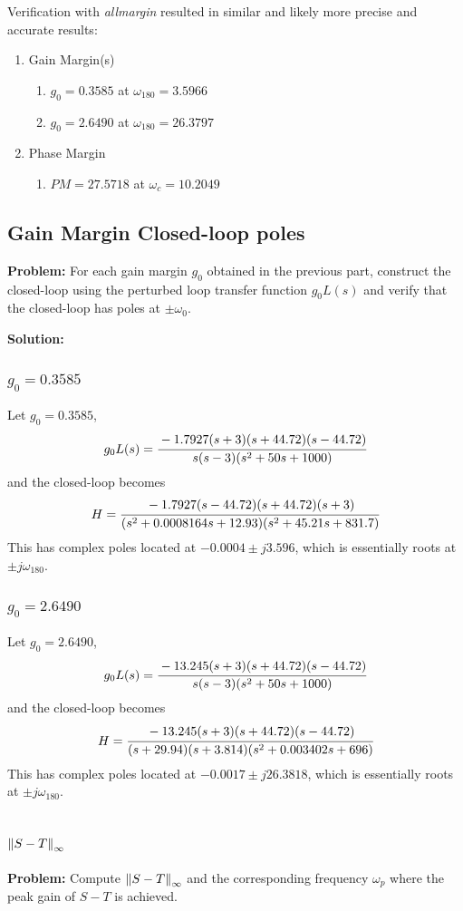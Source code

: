 \documentclass[letter]{article}
\numberwithin{equation}{section}
\begin{document}
Verification with \emph{allmargin} resulted in similar and likely more precise and accurate results:
\begin{enumerate}
	\item Gain Margin(s)
	\begin{enumerate}
		\item $g_0 = 0.3585$ at $\omega_{180} =  3.5966$
		\item $g_0 = 2.6490$ at $\omega_{180} = 26.3797$
	\end{enumerate}
	\item Phase Margin
	\begin{enumerate}
		\item $PM = 27.5718$ at $\omega_{c} = 10.2049$
	\end{enumerate}
\end{enumerate}

\subsection{Gain Margin Closed-loop poles}
\textbf{Problem:} 
For each gain margin $g_0$ obtained in the previous part, construct the closed-loop using the perturbed loop transfer function $g_0 L(s)$ and verify that the closed-loop has poles at $\pm \omega_0$.

\textbf{Solution:}
\subsubsection{$g_0 = 0.3585$}
Let $g_0 = 0.3585$, \[
	g_0 L(s) =  \cfrac{
		-1.7927 (s+3) (s+44.72) (s-44.72)
	}{
	   s (s-3) (s^2 + 50s + 1000)
	}
\] and the closed-loop becomes \[
	H = \cfrac{ 
          -1.7927 (s-44.72) (s+44.72) (s+3)
	}{
		(s^2 + 0.0008164s + 12.93) (s^2 + 45.21s + 831.7)
	}
\] This has complex poles located at $-0.0004 \pm j 3.596$, which is essentially roots at $\pm j \omega_{180}$.


\subsubsection{$g_0 = 2.6490$}
Let $g_0 = 2.6490$, \[
	g_0 L(s) =  \cfrac{
		-13.245 (s+3) (s+44.72) (s-44.72)
	}{
	   s (s-3) (s^2 + 50s + 1000)
	}
\] and the closed-loop becomes \[
	H = \cfrac{ 
		-13.245 (s+3) (s+44.72) (s-44.72)
	}{
		(s+29.94) (s+3.814) (s^2 + 0.003402s + 696)
	}
\] This has complex poles located at $-0.0017 \pm j 26.3818$, which is essentially roots at $\pm j \omega_{180}$.

\subsection{$\norm{S-T}_\infty$}
\textbf{Problem:}
Compute $\norm{S-T}_\infty$ and the corresponding frequency $\omega_{p}$ where the peak gain of $S-T$ is achieved.
\end{document}
